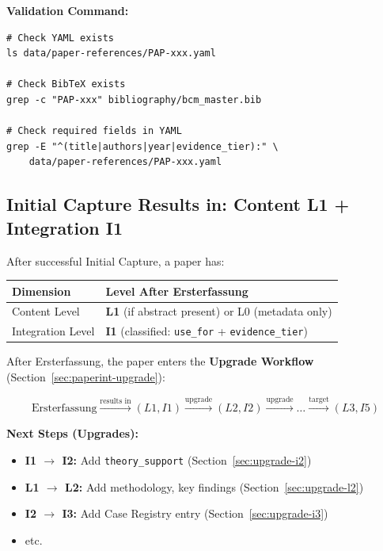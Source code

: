 \textbf{Validation Command:}

\begin{verbatim}
# Check YAML exists
ls data/paper-references/PAP-xxx.yaml

# Check BibTeX exists
grep -c "PAP-xxx" bibliography/bcm_master.bib

# Check required fields in YAML
grep -E "^(title|authors|year|evidence_tier):" \
    data/paper-references/PAP-xxx.yaml
\end{verbatim}

\subsection{Initial Capture Results in: Content L1 + Integration I1}
\label{sec:ersterfassung-result}

After successful Initial Capture, a paper has:

\begin{table}[H]
\centering
\begin{tabular}{@{}ll@{}}
\toprule
\textbf{Dimension} & \textbf{Level After Ersterfassung} \\
\midrule
Content Level & \textbf{L1} (if abstract present) or L0 (metadata only) \\
Integration Level & \textbf{I1} (classified: \texttt{use\_for} + \texttt{evidence\_tier}) \\
\bottomrule
\end{tabular}
\end{table}

\begin{tcolorbox}[colback=blue!5!white, colframe=blue!75!black,
    title=\textbf{Connection to Upgrade Workflow}]

After Ersterfassung, the paper enters the \textbf{Upgrade Workflow} (Section~\ref{sec:paperint-upgrade}):

\begin{equation}
\text{Ersterfassung} \xrightarrow{\text{results in}} (L1, I1) \xrightarrow{\text{upgrade}} (L2, I2) \xrightarrow{\text{upgrade}} \ldots \xrightarrow{\text{target}} (L3, I5)
\end{equation}

\textbf{Next Steps (Upgrades):}
\begin{itemize}[nosep]
    \item \textbf{I1 $\rightarrow$ I2:} Add \texttt{theory\_support} (Section~\ref{sec:upgrade-i2})
    \item \textbf{L1 $\rightarrow$ L2:} Add methodology, key findings (Section~\ref{sec:upgrade-l2})
    \item \textbf{I2 $\rightarrow$ I3:} Add Case Registry entry (Section~\ref{sec:upgrade-i3})
    \item etc.
\end{itemize}

\end{tcolorbox}


